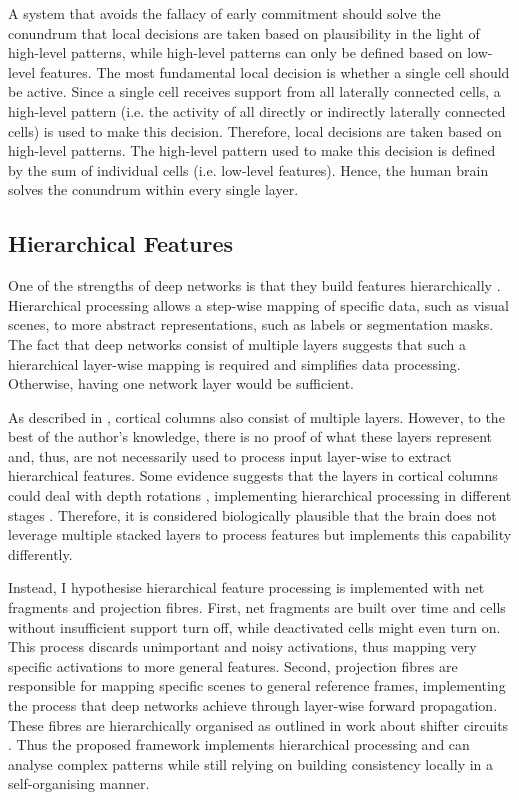 A system that avoids the fallacy of early commitment should solve the conundrum that local decisions are taken based on plausibility in the light of high-level patterns, while high-level patterns can only be defined based on low-level features.
The most fundamental local decision is whether a single cell should be active. Since a single cell receives support from all laterally connected cells, a high-level pattern (i.e. the activity of all directly or indirectly laterally connected cells) is used to make this decision. Therefore, local decisions are taken based on high-level patterns. The high-level pattern used to make this decision is defined by the sum of individual cells (i.e. low-level features). Hence, the human brain solves the conundrum within every single layer.


\subsection{Hierarchical Features}
One of the strengths of deep networks is that they build features hierarchically . Hierarchical processing allows a step-wise mapping of specific data, such as visual scenes, to more abstract representations, such as labels or segmentation masks.
The fact that deep networks consist of multiple layers suggests that such a hierarchical layer-wise mapping is required and simplifies data processing.
Otherwise, having one network layer would be sufficient.

As described in , cortical columns also consist of multiple layers.
However, to the best of the author's knowledge, there is no proof of what these layers represent and, thus, are not necessarily used to process input layer-wise to extract hierarchical features.
Some evidence suggests that the layers in cortical columns could deal with depth rotations , implementing hierarchical processing in different stages .
Therefore, it is considered biologically plausible that the brain does not leverage multiple stacked layers to process features but implements this capability differently.

Instead, I hypothesise hierarchical feature processing is implemented with net fragments and projection fibres.
First, net fragments are built over time and cells without insufficient support turn off, while deactivated cells might even turn on.
This process discards unimportant and noisy activations, thus mapping very specific activations to more general features.
Second, projection fibres are responsible for mapping specific scenes to general reference frames, implementing the process that deep networks achieve through layer-wise forward propagation. These fibres are hierarchically organised as outlined in work about shifter circuits . 
Thus the proposed framework implements hierarchical processing and can analyse complex patterns while still relying on building consistency locally in a self-organising manner.